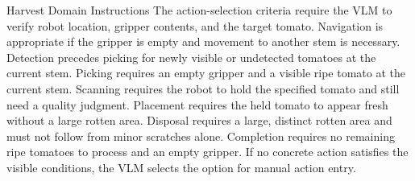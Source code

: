 \begin{vlmpromptbox}{Harvest Domain Instructions}
The action-selection criteria require the VLM to verify robot location, gripper contents, and the target tomato. Navigation is appropriate if the gripper is empty and movement to another stem is necessary. Detection precedes picking for newly visible or undetected tomatoes at the current stem. Picking requires an empty gripper and a visible ripe tomato at the current stem. Scanning requires the robot to hold the specified tomato and still need a quality judgment. Placement requires the held tomato to appear fresh without a large rotten area. Disposal requires a large, distinct rotten area and must not follow from minor scratches alone. Completion requires no remaining ripe tomatoes to process and an empty gripper. If no concrete action satisfies the visible conditions, the VLM selects the option for manual action entry.
\end{vlmpromptbox}
